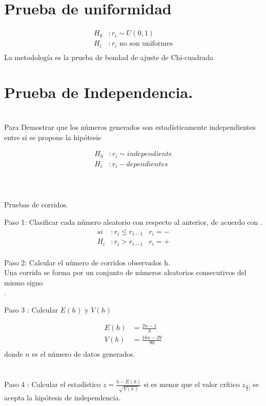 \documentclass[es-lat]{article}
\begin{document}
\section{Prueba de uniformidad}
\begin{align*} 
H_{0} &:  r_{i} \sim U(0,1)\\ 
H_{i} &:  r_{i} \text{ no son uniformes} \\ 
\end{align*}
La metodología es la prueba de bondad de ajuste de Chi-cuadrada




\section{Prueba de Independencia.}
\\Para Demostrar que los números generados son estadísticamente independientes entre si se propone la hipótesis

\begin{align*} 
H_{0} &:  r_{i} \sim independiente\\ 
H_{i} &:  r_{i} - dependientes \\ 
\end{align*}

\\\\Pruebas de corridos.

Paso 1: Clasificar cada número aleatorio con respecto al anterior, de acuerdo con .
\begin{align*} 
si &:  r_{i} \leq r_{i-1} & r_{i}= -\\ 
H_{i} &:  r_{i} >r_{i-1} & r_{i} = + \\ 
\end{align*}


Paso 2: Calcular el número de corridos observados h. \\Una corrida se forma por un conjunto de números aleatorios consecutivos del mismo signo\\.

Paso 3 : Calcular $E(h)$ y $V(h)$

\begin{align*} 
E(h) &=  \tfrac{2n-1}{3}\\ 
V(h) &=  \tfrac{16n-29}{90}\\ 
\end{align*}
donde $n$ es el número de datos generados.\\

\\\\Paso 4 : Calcular el estadístico $z=\tfrac{h-E(h)}{\sqrt{V(h)}}$
si es menor que el valor crítico $z_{\tfrac{\alpha}{2}]}$ se acepta la hipótesis de independencia.
\end{document}
